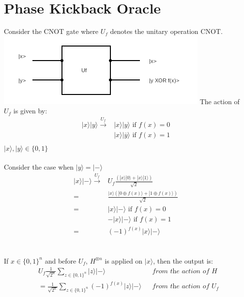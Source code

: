 \documentclass{article}
\begin{document}
\section{Phase Kickback Oracle}
Consider the CNOT gate where $U_f$ denotes the unitary operation CNOT.\\
\includegraphics{CNOT.png}
The action of $U_f$ is given by:
\begin{align*}
	|x\rangle|y\rangle \xrightarrow{U_f} & |x\rangle|y\rangle \text{ if }f(x)=0            \\
	                                     & |x\rangle|\overline{y}\rangle \text{ if }f(x)=1 \\
\end{align*}
$|x\rangle,|y\rangle \in \{0,1\}$
\\
\\
Consider the case when $|y\rangle=|-\rangle$
\begin{align*}
	|x\rangle|-\rangle \xrightarrow{U_f} & U_f\frac{(|x\rangle|0\rangle+|x\rangle|1\rangle)}{\sqrt{2}}              \\
	=                                    & \frac{|x\rangle(|0 \oplus f(x)\rangle +|1 \oplus f(x)\rangle)}{\sqrt{2}} \\
	=                                    & |x\rangle|-\rangle \text{ if } f(x)=0                                    \\
	                                     & -|x\rangle|-\rangle \text{ if } f(x)=1                                   \\
	=                                    & (-1)^{f(x)}|x\rangle|-\rangle
\end{align*}
\\
\\
If $x \in \{0, 1\}^n$ and before $U_f$, $H^{\otimes n}$ is applied on $|x\rangle$, then the output is:
\begin{align*}
	 & U_f \frac{1}{\sqrt{2^n}}\sum_{z \in \{0,1\}^n} |z\rangle|-\rangle           &  & \textit{from the action of H}     \\
	 & =\frac{1}{\sqrt{2^n}}\sum_{z \in \{0,1\}^n} (-1)^{f(x)} |z\rangle |-\rangle &  & \textit{from the action of $U_f$}
\end{align*}
\end{document}
